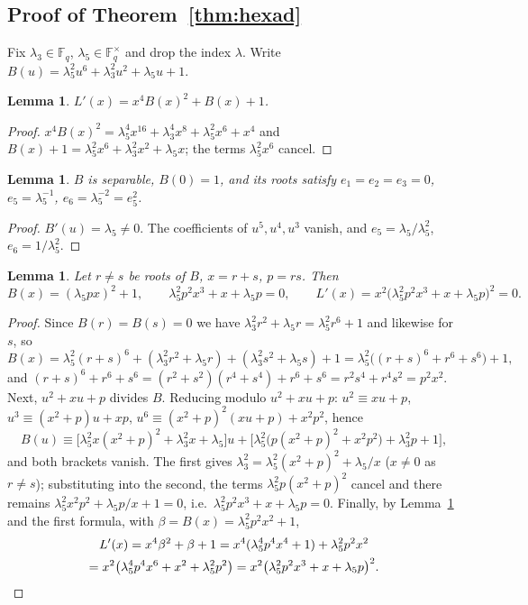 ﻿\documentclass[12pt,a4paper]{amsart}
\newtheorem{lemma}[theorem]{Lemma}
\theoremstyle{definition}
\newcommand{\F}{\mathbb{F}}
\begin{document}
\subsection{Proof of Theorem~\ref{thm:hexad}}
Fix $\lambda_3\in\F_q$, $\lambda_5\in\F_q^\times$ and drop the index $\lambda$. Write $B(u)=\lambda_5^2u^6+\lambda_3^2u^2+\lambda_5u+1$.

\begin{lemma}\label{lem:identity}
$L'(x)=x^4B(x)^2+B(x)+1$.
\end{lemma}
\begin{proof}
$x^4B(x)^2=\lambda_5^4x^{16}+\lambda_3^4x^8+\lambda_5^2x^6+x^4$ and $B(x)+1=\lambda_5^2x^6+\lambda_3^2x^2+\lambda_5x$; the terms $\lambda_5^2x^6$ cancel.
\end{proof}

\begin{lemma}\label{lem:separable}
$B$ is separable, $B(0)=1$, and its roots satisfy $e_1=e_2=e_3=0$, $e_5=\lambda_5^{-1}$, $e_6=\lambda_5^{-2}=e_5^2$.
\end{lemma}
\begin{proof}
$B'(u)=\lambda_5\ne0$. The coefficients of $u^5,u^4,u^3$ vanish, and $e_5=\lambda_5/\lambda_5^2$, $e_6=1/\lambda_5^2$.
\end{proof}

\begin{lemma}\label{lem:pairsum}
Let $r\ne s$ be roots of $B$, $x=r+s$, $p=rs$. Then
\[
B(x)=(\lambda_5px)^2+1,\qquad \lambda_5^2p^2x^3+x+\lambda_5p=0,\qquad L'(x)=x^2\bigl(\lambda_5^2p^2x^3+x+\lambda_5p\bigr)^2=0 .
\]
\end{lemma}
\begin{proof}
Since $B(r)=B(s)=0$ we have $\lambda_3^2r^2+\lambda_5r=\lambda_5^2r^6+1$ and likewise for $s$, so
\[
B(x)=\lambda_5^2(r+s)^6+(\lambda_3^2r^2+\lambda_5r)+(\lambda_3^2s^2+\lambda_5s)+1=\lambda_5^2\bigl((r+s)^6+r^6+s^6\bigr)+1 ,
\]
and $(r+s)^6+r^6+s^6=(r^2+s^2)(r^4+s^4)+r^6+s^6=r^2s^4+r^4s^2=p^2x^2$. Next, $u^2+xu+p$ divides $B$. Reducing modulo $u^2+xu+p$: $u^2\equiv xu+p$, $u^3\equiv(x^2+p)u+xp$, $u^6\equiv(x^2+p)^2(xu+p)+x^2p^2$, hence
\[
B(u)\equiv\bigl[\lambda_5^2x(x^2+p)^2+\lambda_3^2x+\lambda_5\bigr]u+\bigl[\lambda_5^2\bigl(p(x^2+p)^2+x^2p^2\bigr)+\lambda_3^2p+1\bigr],
\]
and both brackets vanish. The first gives $\lambda_3^2=\lambda_5^2(x^2+p)^2+\lambda_5/x$ ($x\ne0$ as $r\ne s$); substituting into the second, the terms $\lambda_5^2p(x^2+p)^2$ cancel and there remains $\lambda_5^2x^2p^2+\lambda_5p/x+1=0$, i.e.\ $\lambda_5^2p^2x^3+x+\lambda_5p=0$. Finally, by Lemma~\ref{lem:identity} and the first formula, with $\beta=B(x)=\lambda_5^2p^2x^2+1$,
\begin{multline*}
L'(x)=x^4\beta^2+\beta+1=x^4(\lambda_5^4p^4x^4+1)+\lambda_5^2p^2x^2\\
=x^2\bigl(\lambda_5^4p^4x^6+x^2+\lambda_5^2p^2\bigr)=x^2\bigl(\lambda_5^2p^2x^3+x+\lambda_5p\bigr)^2 .\qedhere
\end{multline*}
\end{proof}
\end{document}
